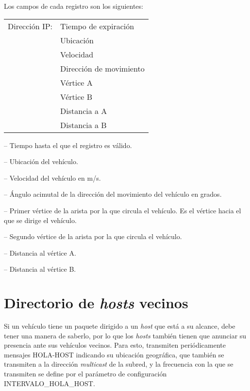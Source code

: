 Los campos de cada registro son los siguientes:

\begin{center}
\begin{tabular}{ r l }
Dirección IP: & Tiempo de expiración \\
& Ubicación \\
& Velocidad \\
& Dirección de movimiento \\
& Vértice A \\
& Vértice B \\
& Distancia a A \\
& Distancia a B
\end{tabular}
\end{center}

 -- Tiempo hasta el que el registro es válido.

 -- Ubicación del vehículo.

 -- Velocidad del vehículo en m/s.

 -- Ángulo acimutal de la dirección del
movimiento del vehículo en grados.

 -- Primer vértice de la arista por la que
circula el vehículo. Es el vértice hacia el que se dirige el vehículo.

 -- Segundo vértice de la arista por la que
circula el vehículo.

 -- Distancia al vértice A.

 -- Distancia al vértice B.

\section{Directorio de \textit{hosts} vecinos}
\label{sec:directorio_hosts_vecinos}

\begin{sloppypar}
Si un vehículo tiene un paquete dirigido a un \textit{host} que está a su
alcance, debe tener una manera de saberlo, por lo que los \textit{hosts} también
tienen que anunciar su presencia ante sus vehículos vecinos. Para esto,
transmiten periódicamente mensajes \mbox{HOLA-HOST} indicando su ubicación
geográfica, que también se transmiten a la dirección \textit{multicast} de la
subred, y la frecuencia con la que se transmiten se define por el parámetro de
configuración \mbox{INTERVALO\_HOLA\_HOST}.
\end{sloppypar}

